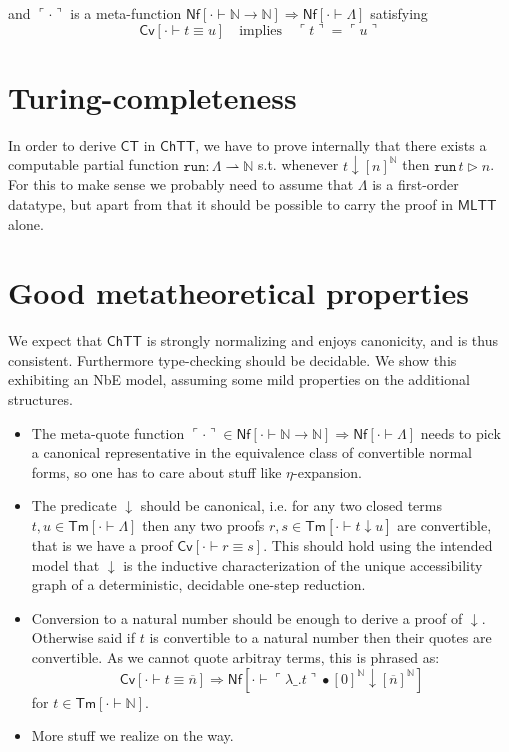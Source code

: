 \documentclass{article}
\newcommand{\MLTT}{\ensuremath{\mathsf{MLTT}}}
\newcommand{\CT}{\ensuremath{\mathsf{CT}}}
\newcommand{\CTTT}{\ensuremath{\mathsf{ChTT}}}
\newcommand{\Trm}[2]{\mathsf{Tm}[{{#1} \vdash {#2}}]}
\newcommand{\TNf}[2]{ {\mathsf{Nf}}[{{#1} \vdash {#2}}]}
\newcommand{\TEq}[3]{ {\mathsf{Cv}}[{{#1} \vdash {#2} \equiv {#3}}]}
\newcommand{\Code}{\Lambda}
\newcommand{\TNat}{\mathbb{N}}
\newcommand{\QNf}[1]{{\ulcorner{#1}\urcorner}}
\newcommand{\CRed}{\mathrel{\downarrow}}
\newcommand{\CApp}{\bullet}
\newcommand{\Reif}[2]{{[#1]}^{#2}}
\begin{document}
\noindent and $\QNf{\cdot}$ is a meta-function $\TNf{\cdot}{\TNat\rightarrow\TNat} \Rightarrow \TNf{\cdot}{\Code}$ satisfying
\[ \TEq{\cdot}{t}{u} \quad \text{implies}\quad \QNf{t} = \QNf{u} \]

\section{Turing-completeness}

In order to derive $\CT$ in $\CTTT$, we have to prove internally that there exists a computable partial function $\mathtt{run} : \Code \rightharpoonup \TNat$ s.t. whenever $t \CRed \Reif{n}{\TNat}$ then $\mathtt{run}\, t \rhd n$. For this to make sense we probably need to assume that $\Code$ is a first-order datatype, but apart from that it should be possible to carry the proof in $\MLTT$ alone. %

\section{Good metatheoretical properties}

We expect that $\CTTT$ is strongly normalizing and enjoys canonicity, and is thus consistent. Furthermore type-checking should be decidable. We show this exhibiting an NbE model, assuming some mild properties on the additional structures.

\begin{itemize}
 \item The meta-quote function $\QNf{\cdot} \in \TNf{\cdot}{\TNat\rightarrow\TNat} \Rightarrow \TNf{\cdot}{\Code}$ needs to pick a canonical representative in the equivalence class of convertible normal forms, so one has to care about stuff like $\eta$-expansion.
 \item The predicate $\CRed$ should be canonical, i.e. for any two closed terms $t, u \in \Trm{\cdot}{\Code}$ then any two proofs $r, s \in \Trm{\cdot}{t \CRed u}$ are convertible, that is we have a proof $\TEq{\cdot}{r}{s}$. This should hold using the intended model that $\CRed$ is the inductive characterization of the unique accessibility graph of a deterministic, decidable one-step reduction.
 \item Conversion to a natural number should be enough to derive a proof of $\CRed$. Otherwise said if $t$ is convertible to a natural number then their quotes are convertible. As we cannot quote arbitray terms, this is phrased as:
   $$\TEq{\cdot}{t}{\overline{n}} \Rightarrow \TNf{\cdot}{\QNf{\lambda \_ . t} \CApp [0]^{\mathbb{N}} \downarrow [\overline{n}]^{\mathbb{N}}}$$
   for $t \in \Trm{\cdot}{\mathbb{N}}$.
 \item More stuff we realize on the way.
\end{itemize}
\end{document}

